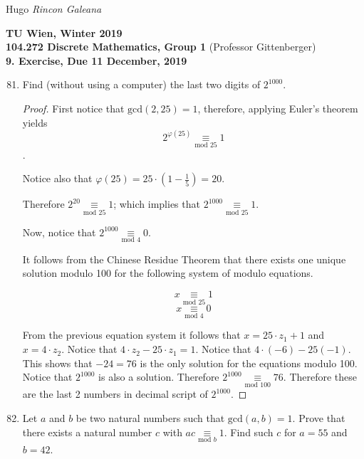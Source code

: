\documentclass[12pt]{article}
\newcommand{\Term}{Winter 2019}
\newcommand{\Course}{104.272 Discrete Mathematics, Group 1}
\newcommand{\Assignment}{9. Exercise}
\newcommand{\DueDate}{ 11 December, 2019 }
\begin{document}
Hugo \textit{Rincon Galeana}
\begin{center}

\textbf{TU Wien, \Term} \\
\textbf{\Course} (Professor Gittenberger) \\
\textbf{\Assignment, Due \DueDate}
\end{center}


\begin{enumerate}
    \setcounter{enumi}{80}
    \item Find (without using a computer) the last two digits of $2^{1000}$.
    \begin{proof}
    
    First notice that $\textrm{gcd}(2,25) = 1$, therefore, applying Euler's theorem yields $$ 2^{\varphi(25)} \underset{\textrm{mod } 25}{\equiv} 1$$.
    
    Notice also that $\varphi(25) = 25 \cdot \displaystyle \left (1- \frac{1}{5} \right) = 20$.
    
    Therefore $2^{20} \underset{\textrm{mod } 25}{\equiv} 1$; which implies that $2^{1000} \underset{\textrm{mod } 25}{\equiv} 1$.
    
    Now, notice that $2^{1000} \underset{\textrm{mod } 4}{\equiv} 0$.
    
    It follows from the Chinese Residue Theorem that there exists one unique solution modulo 100 for the following system of modulo equations.
    
    $$ x \underset{\textrm{mod }25}{\equiv} 1$$
    $$ x \underset{\textrm{mod }4}{\equiv} 0$$
    
    From the previous equation system it follows that $x = 25 \cdot z_1 + 1$ and $x = 4 \cdot z_2$. Notice that $4 \cdot z_2 - 25 \cdot z_1 = 1$. Notice that $4 \cdot (-6) - 25 (-1)$. This shows that $-24 = 76$ is the only solution for the equations  modulo 100. Notice that $2^{1000}$ is also a solution. Therefore $2^{1000} \underset{\textrm{mod }100}{\equiv} 76$. Therefore these are the last 2 numbers in decimal script of $2^{1000}$.
    \end{proof}
    
    \item Let $a$ and $b$ be two natural numbers such that $\textrm{gcd}(a,b)=1$. Prove that there exists a natural number $c$ with $ac \underset{\textrm{mod }b}{\equiv} 1$. Find such $c$ for $a=55$ and $b = 42$.
    

\end{enumerate}
\end{document}
